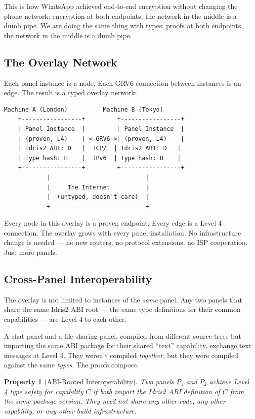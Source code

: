 \documentclass[11pt,a4paper]{article}
\newtheorem{property}{Property}
\begin{document}
This is how WhatsApp achieved end-to-end encryption without changing
the phone network: encryption at both endpoints, the network in the
middle is a dumb pipe. We are doing the same thing with types: proofs
at both endpoints, the network in the middle is a dumb pipe.

\subsection{The Overlay Network}

Each panel instance is a node. Each GRV6 connection between instances is
an edge. The result is a typed overlay network:

\begin{lstlisting}[caption={The typed overlay}]
    Machine A (London)          Machine B (Tokyo)
    +-----------------+         +-----------------+
    | Panel Instance  |         | Panel Instance  |
    | (proven, L4)    | <-GRV6->| (proven, L4)    |
    | Idris2 ABI: D   |  TCP/  | Idris2 ABI: D   |
    | Type hash: H    |  IPv6  | Type hash: H    |
    +-----------------+         +-----------------+
            |                           |
            |     The Internet          |
            |  (untyped, doesn't care)  |
            +---------------------------+
\end{lstlisting}

Every node in this overlay is a proven endpoint. Every edge is a Level 4
connection. The overlay grows with every panel installation. No
infrastructure change is needed --- no new routers, no protocol
extensions, no ISP cooperation. Just more panels.

\subsection{Cross-Panel Interoperability}

The overlay is not limited to instances of the \emph{same} panel. Any
two panels that share the same Idris2 ABI root --- the same type
definitions for their common capabilities --- are Level 4 to each other.

A chat panel and a file-sharing panel, compiled from different source
trees but importing the same ABI package for their shared ``text''
capability, exchange text messages at Level 4. They weren't compiled
\emph{together}, but they were compiled against the same \emph{types}.
The proofs compose.

\begin{property}[ABI-Rooted Interoperability]
Two panels $P_1$ and $P_2$ achieve Level 4 type safety for capability $C$
if both import the Idris2 ABI definition of $C$ from the same package
version. They need not share any other code, any other capability, or
any other build infrastructure.
\end{property}
\end{document}
